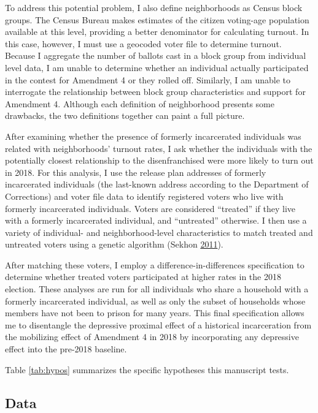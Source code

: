 \documentclass[
  12pt,
]{article}
\begin{document}
To address this potential problem, I also define neighborhoods as Census block groups. The Census Bureau makes estimates of the citizen voting-age population available at this level, providing a better denominator for calculating turnout. In this case, however, I must use a geocoded voter file to determine turnout. Because I aggregate the number of ballots cast in a block group from individual level data, I am unable to determine whether an individual actually participated in the contest for Amendment 4 or they rolled off. Similarly, I am unable to interrogate the relationship between block group characteristics and support for Amendment 4. Although each definition of neighborhood presents some drawbacks, the two definitions together can paint a full picture.

After examining whether the presence of formerly incarcerated individuals was related with neighborhoods' turnout rates, I ask whether the individuals with the potentially closest relationship to the disenfranchised were more likely to turn out in 2018. For this analysis, I use the release plan addresses of formerly incarcerated individuals (the last-known address according to the Department of Corrections) and voter file data to identify registered voters who live with formerly incarcerated individuals. Voters are considered ``treated'' if they live with a formerly incarcerated individual, and ``untreated'' otherwise. I then use a variety of individual- and neighborhood-level characteristics to match treated and untreated voters using a genetic algorithm (Sekhon \protect\hyperlink{ref-Sekhon2011}{2011}).

After matching these voters, I employ a difference-in-differences specification to determine whether treated voters participated at higher rates in the 2018 election. These analyses are run for all individuals who share a household with a formerly incarcerated individual, as well as only the subset of households whose members have not been to prison for many years. This final specification allows me to disentangle the depressive proximal effect of a historical incarceration from the mobilizing effect of Amendment 4 in 2018 by incorporating any depressive effect into the pre-2018 baseline.

Table \ref{tab:hypos} summarizes the specific hypotheses this manuscript tests.



\hypertarget{data}{%
\subsection*{Data}\label{data}}
\end{document}
